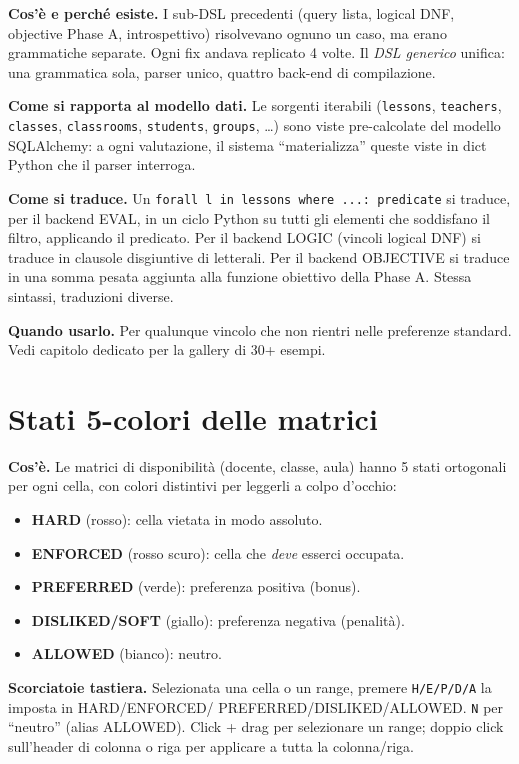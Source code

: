 \textbf{Cos'\`e e perch\'e esiste.} I sub-DSL precedenti
(query lista, logical DNF, objective Phase A, introspettivo)
risolvevano ognuno un caso, ma erano grammatiche separate.
Ogni fix andava replicato 4 volte. Il \emph{DSL generico}
unifica: una grammatica sola, parser unico, quattro back-end di
compilazione.

\textbf{Come si rapporta al modello dati.} Le sorgenti
iterabili (\texttt{lessons}, \texttt{teachers},
\texttt{classes}, \texttt{classrooms}, \texttt{students},
\texttt{groups}, \dots) sono viste pre-calcolate del modello
SQLAlchemy: a ogni valutazione, il sistema ``materializza''
queste viste in dict Python che il parser interroga.

\textbf{Come si traduce.} Un \texttt{forall l in lessons
where ...: predicate} si traduce, per il backend EVAL, in un
ciclo Python su tutti gli elementi che soddisfano il filtro,
applicando il predicato. Per il backend LOGIC (vincoli
logical DNF) si traduce in clausole disgiuntive di
letterali. Per il backend OBJECTIVE si traduce in una somma
pesata aggiunta alla funzione obiettivo della Phase A. Stessa
sintassi, traduzioni diverse.

\textbf{Quando usarlo.} Per qualunque vincolo che non rientri
nelle preferenze standard. Vedi capitolo dedicato per la
gallery di 30+ esempi.

\section{Stati 5-colori delle matrici}

\textbf{Cos'\`e.} Le matrici di disponibilit\`a (docente,
classe, aula) hanno 5 stati ortogonali per ogni cella, con
colori distintivi per leggerli a colpo d'occhio:

\begin{itemize}
\item \textbf{HARD} (rosso): cella vietata in modo assoluto.
\item \textbf{ENFORCED} (rosso scuro): cella che \emph{deve}
  esserci occupata.
\item \textbf{PREFERRED} (verde): preferenza positiva (bonus).
\item \textbf{DISLIKED/SOFT} (giallo): preferenza negativa
  (penalit\`a).
\item \textbf{ALLOWED} (bianco): neutro.
\end{itemize}

\textbf{Scorciatoie tastiera.} Selezionata una cella o un
range, premere \texttt{H/E/P/D/A} la imposta in HARD/ENFORCED/
PREFERRED/DISLIKED/ALLOWED. \texttt{N} per ``neutro'' (alias
ALLOWED). Click + drag per selezionare un range; doppio click
sull'header di colonna o riga per applicare a tutta la
colonna/riga.

